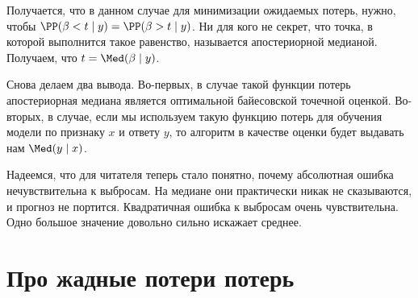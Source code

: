 Получается, что в данном случае для минимизации ожидаемых потерь, нужно, чтобы $\PP(\beta < t \mid y) = \PP(\beta > t \mid y)$. Ни для кого не секрет, что точка, в которой выполнится такое равенство, называется апостериорной медианой. Получаем, что $t = \Med(\beta \mid y)$. 

Снова делаем два вывода. Во-первых, в случае такой функции потерь апостериорная медиана является оптимальной байесовской точечной оценкой. Во-вторых, в случае, если мы используем такую функцию потерь для обучения модели по признаку $x$ и ответу $y$, то алгоритм в качестве оценки будет выдавать нам $\Med(y \mid x)$.  

Надеемся, что для читателя теперь стало понятно, почему абсолютная ошибка нечувствительна к выбросам. На медиане они практически никак не сказываются, и прогноз не портится. Квадратичная ошибка к выбросам очень чувствительна. Одно большое значение довольно сильно искажает среднее.

\section{Про жадные потери потерь} 

%





